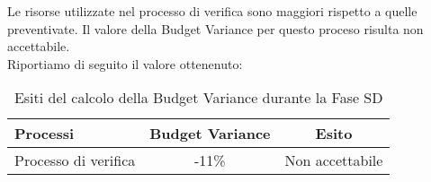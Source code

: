 			Le risorse utilizzate nel processo di verifica sono maggiori rispetto a quelle preventivate. Il valore della Budget Variance per questo proceso risulta non accettabile.\\ 
			Riportiamo di seguito il valore ottenenuto:
			\begin{table}[H]
					\centering
					\begin{tabu}{| l | c | c |}
							\hline
							Processi 							& Budget Variance	& Esito		\\ \hline \hline
							Processo di verifica & -11\% & Non accettabile \\ \hline
						\end{tabu}
					\caption{Esiti del calcolo della Budget Variance durante la Fase SD}
				\end{table}	
							
